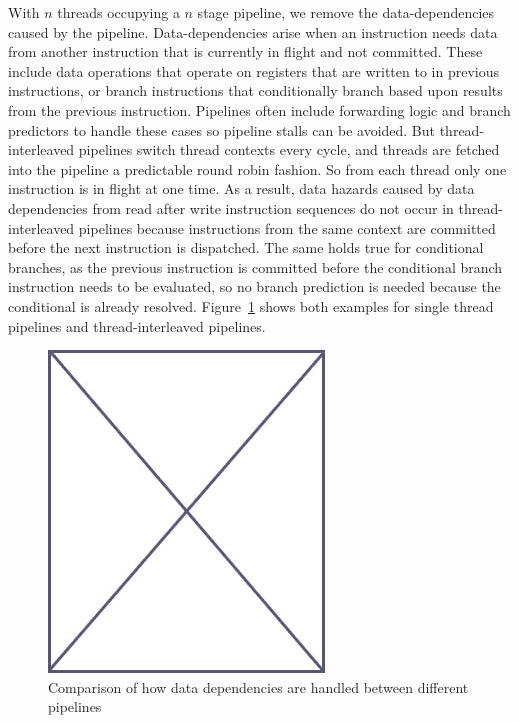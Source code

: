 With $n$ threads occupying a $n$ stage pipeline, we remove the data-dependencies caused by the pipeline.
Data-dependencies arise when an instruction needs data from another instruction that is currently in flight and not committed. 
These include data operations that operate on registers that are written to in previous instructions, or branch instructions that conditionally branch based upon results from the previous instruction.   
Pipelines often include forwarding logic and branch predictors to handle these cases so pipeline stalls can be avoided.
But thread-interleaved pipelines switch thread contexts every cycle, and threads are fetched into the pipeline a predictable round robin fashion.
So from each thread only one instruction is in flight at one time. 
As a result, data hazards caused by data dependencies from read after write instruction sequences do not occur in thread-interleaved pipelines because instructions from the same context are committed before the next instruction is dispatched.
The same holds true for conditional branches, as the previous instruction is committed before the conditional branch instruction needs to be evaluated, so no branch prediction is needed because the conditional is already resolved.       
Figure~\ref{fig:hazard_comparison_between_pipelines} shows both examples for single thread pipelines and thread-interleaved pipelines.      
\begin{figure}
\begin{center}
\includegraphics[scale=.4]{figs/placeholder}
\end{center}
\caption{Comparison of how data dependencies are handled between different pipelines}
\label{fig:hazard_comparison_between_pipelines}
\end{figure}

